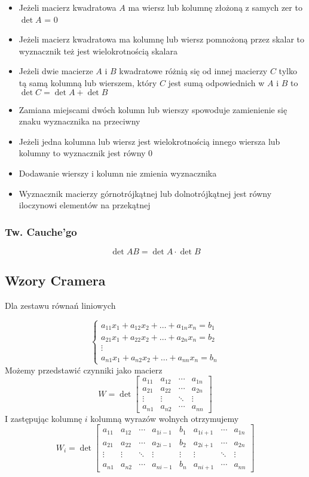 \documentclass{../notatki}
\begin{document}
\begin{itemize}
  \item Jeżeli macierz kwadratowa $A$ ma wiersz lub kolumnę złożoną z
    samych zer to $\det A$ = 0
  \item Jeżeli macierz kwadratowa ma kolumnę lub wiersz pomnożoną
    przez skalar to wyznacznik też jest wielokrotnością skalara
  \item Jeżeli dwie macierze $A$ i $B$ kwadratowe różnią się od innej
    macierzy $C$ tylko tą samą kolumną lub wierszem, który $C$ jest
    sumą odpowiednich w $A$ i $B$ to $\det C = \det A + \det B$
  \item Zamiana miejscami dwóch kolumn lub wierszy spowoduje
    zamienienie się znaku wyznacznika na przeciwny
  \item Jeżeli jedna kolumna lub wiersz jest wielokrotnością innego
    wiersza lub kolumny to wyznacznik jest równy 0
  \item Dodawanie wierszy i kolumn nie zmienia wyznacznika
  \item Wyznacznik macierzy górnotrójkątnej lub dolnotrójkątnej jest
    równy iloczynowi elementów na przekątnej
\end{itemize}

\subsubsection{Tw. Cauche'go}

$$
\det AB = \det A \cdot \det B
$$

\subsection{Wzory Cramera}

Dla zestawu równań liniowych

$$
\begin{cases}
  a_{11}x_1 + a_{12}x_2 + \dots + a_{1n}x_n = b_1 \\
  a_{21}x_1 + a_{22}x_2 + \dots + a_{2n}x_n = b_2 \\
  \vdots \\
  a_{n1}x_1 + a_{n2}x_2 + \dots + a_{nn}x_n = b_n
\end{cases}
$$
Możemy przedstawić czynniki jako macierz
$$
W = \det
\begin{bmatrix}
  a_{11} & a_{12} & \cdots & a_{1n} \\
  a_{21} & a_{22} & \cdots & a_{2n} \\
  \vdots & \vdots & \ddots & \vdots \\
  a_{n1} & a_{n2} & \cdots & a_{nn}
\end{bmatrix}
$$
I zastępując kolumnę $i$ kolumną wyrazów wolnych otrzymujemy
$$
W_i = \det
\begin{bmatrix}
  a_{11} & a_{12} & \cdots & a_{1i-1} & b_1 & a_{1i+1} & \cdots & a_{1n} \\
  a_{21} & a_{22} & \cdots & a_{2i-1} & b_2 & a_{2i+1} & \cdots & a_{2n} \\
  \vdots & \vdots & \ddots & \vdots & \vdots & \vdots & \ddots & \vdots \\
  a_{n1} & a_{n2} & \cdots & a_{ni-1} & b_n & a_{ni+1} & \cdots & a_{nn}
\end{bmatrix}
$$
\end{document}
